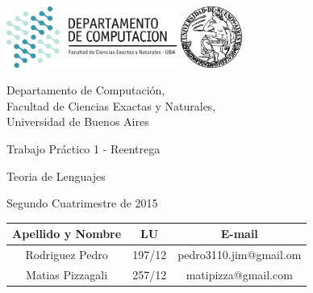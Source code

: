 \documentclass[a4paper, 10pt, twoside]{article}
\begin{document}


\thispagestyle{caratula}

\begin{center}

\includegraphics[height=2cm]{DC.png}
\hfill
\includegraphics[height=2cm]{UBA.jpg}

\vspace{2cm}

Departamento de Computación,\\
Facultad de Ciencias Exactas y Naturales,\\
Universidad de Buenos Aires

\vspace{4cm}

\begin{Huge}
Trabajo Práctico 1 - Reentrega
\end{Huge}

\vspace{0.5cm}

\begin{Large}
Teoria de Lenguajes
\end{Large}

\vspace{1cm}

Segundo Cuatrimestre de 2015

\vspace{4cm}

\begin{tabular}{|c|c|c|}
\hline
Apellido y Nombre & LU & E-mail\\
\hline
Rodriguez Pedro & 197/12 & pedro3110.jim@gmail.om \\
Matias Pizzagali & 257/12 & matipizza@gmail.com \\
\hline
\end{tabular}

\end{center}
\end{document}
